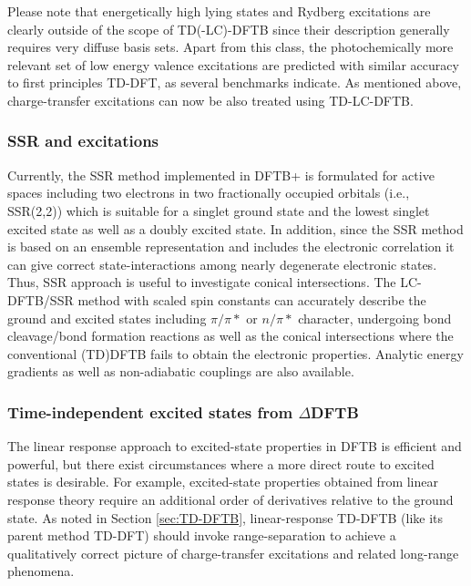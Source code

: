\documentclass[reprint,onecolumn,superscriptaddress]{revtex4-1}
\newcommand{\dftbp}{DFTB+}
\begin{document}
Please note that energetically high lying states and Rydberg excitations are
clearly outside of the scope of TD(-LC)-DFTB since their description generally
requires very diffuse basis sets. Apart from this class, the photochemically
more relevant set of low energy valence excitations are predicted with similar
accuracy to first principles TD-DFT, as several benchmarks
indicate.\cite{trani2011time,Dominguez2013,fihey2019performances} As mentioned
above, charge-transfer excitations can now be also treated using
TD-LC-DFTB.\cite{Kranz2017}

\subsubsection{SSR and excitations}
\label{para:ssrxc}

Currently, the SSR method implemented in \dftbp{} is formulated for active
spaces including two electrons in two fractionally occupied orbitals (i.e.,
SSR(2,2)) which is suitable for a singlet ground state and the lowest singlet
excited state as well as a doubly excited state.\cite{Lee19} In addition, since
the SSR method is based on an ensemble representation and includes the
electronic correlation it can give correct state-interactions among nearly
degenerate electronic states. Thus, SSR approach is useful to investigate
conical intersections. The LC-DFTB/SSR method with scaled spin constants can
accurately describe the ground and excited states including $\pi/\pi*$ or
$n/\pi*$ character, undergoing bond cleavage/bond formation reactions as well as
the conical intersections where the conventional (TD)DFTB fails to obtain the
electronic properties. Analytic energy gradients as well as non-adiabatic
couplings are also available.


\subsubsection{Time-independent excited states from $\Delta$DFTB}

The linear response approach to excited-state properties in DFTB is efficient
and powerful, but there exist circumstances where a more direct route to excited
states is desirable. For example, excited-state properties obtained from linear
response theory require an additional order of derivatives relative to the
ground state. As noted in Section \ref{sec:TD-DFTB}, linear-response TD-DFTB
(like its parent method TD-DFT)\cite{Dreuw2004} should invoke range-separation
to achieve a qualitatively correct picture of charge-transfer excitations and
related long-range phenomena.\cite{Kranz2017}
\end{document}
